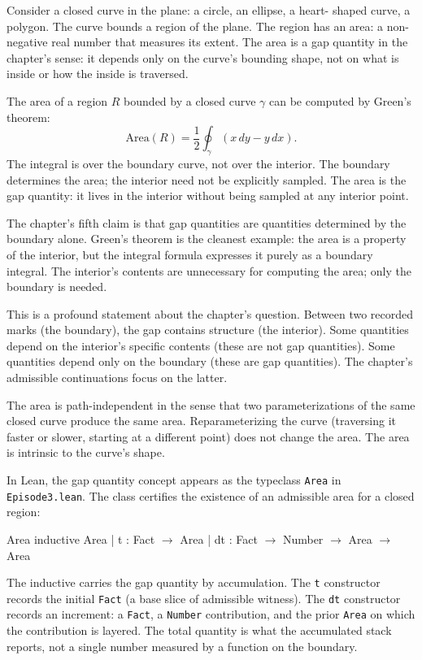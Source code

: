 Consider a closed curve in the plane: a circle, an ellipse, a heart-
shaped curve, a polygon. The curve bounds a region of the plane. The
region has an area: a non-negative real number that measures its
extent. The area is a gap quantity in the chapter's sense: it depends
only on the curve's bounding shape, not on what is inside or how the
inside is traversed.

The area of a region $R$ bounded by a closed curve $\gamma$ can be
computed by Green's theorem:
\[
\text{Area}(R) = \frac{1}{2} \oint_\gamma (x \, dy - y \, dx).
\]
The integral is over the boundary curve, not over the interior. The
boundary determines the area; the interior need not be explicitly
sampled. The area is the gap quantity: it lives in the interior
without being sampled at any interior point.

The chapter's fifth claim is that gap quantities are quantities
determined by the boundary alone. Green's theorem is the cleanest
example: the area is a property of the interior, but the integral
formula expresses it purely as a boundary integral. The interior's
contents are unnecessary for computing the area; only the boundary
is needed.

This is a profound statement about the chapter's question. Between
two recorded marks (the boundary), the gap contains structure (the
interior). Some quantities depend on the interior's specific
contents (these are not gap quantities). Some quantities depend only
on the boundary (these are gap quantities). The chapter's
admissible continuations focus on the latter.

The area is path-independent in the sense that two parameterizations
of the same closed curve produce the same area. Reparameterizing the
curve (traversing it faster or slower, starting at a different
point) does not change the area. The area is intrinsic to the
curve's shape.

In Lean, the gap quantity concept appears as the typeclass
\texttt{Area} in \texttt{Episode3.lean}. The class certifies the
existence of an admissible area for a closed region:

\begin{leanexcerpt}{Area}
inductive Area
  | t : Fact $\to$ Area
  | dt : Fact $\to$ Number $\to$ Area $\to$ Area
\end{leanexcerpt}

The inductive carries the gap quantity by accumulation. The
\texttt{t} constructor records the initial \texttt{Fact} (a base
slice of admissible witness). The \texttt{dt} constructor records
an increment: a \texttt{Fact}, a \texttt{Number} contribution, and
the prior \texttt{Area} on which the contribution is layered. The
total quantity is what the accumulated stack reports, not a single
number measured by a function on the boundary.

